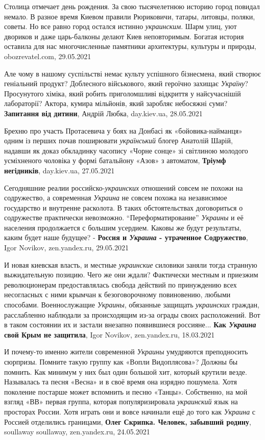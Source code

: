 Столица отмечает день рождения. За свою тысячелетнюю историю город повидал
немало. В разное время Киевом правили Рюриковичи, татары, литовцы, поляки,
советы. Но все равно город остался истинно \emph{украинским}. Шарм улиц, уют
двориков и даже царь-балконы делают Киев неповторимым. Богатая история оставила
для нас многочисленные памятники архитектуры, культуры и природы, obozrevatel.com, 29.05.2021

Але чому в нашому суспільстві немає культу успішного бізнесмена, який створює
геніальний продукт? Доблесного військового, який героїчно захищає
\emph{Україну}?  Просунутого хіміка, який робить приголомшливі відкриття у
найсучаснішій лабораторії? Актора, кумира мільйонів, який заробляє небосяжні
суми? \textbf{Запитання від дитини}, Андрій Любка, day.kiev.ua, 28.05.2021

Брехню про участь Протасевича у боях на Донбасі як «бойовика-найманця» одним із
перших почав поширювати \emph{український} блогер Анатолій Шарій, надавши як
доказ обкладинку часопису «Чорне сонце» зі світлиною молодого усміхненого
чоловіка у формі батальйону «Азов» з автоматом, \textbf{Тріумф негідників},
day.kiev.ua, 27.05.2021

Сегодняшние реалии российско-\emph{украинских} отношений совсем не похожи на
содружество, а современная \emph{Украина} не совсем похожа на независимое
государство и внутренне расколота. В таких обстоятельствах договориться о
содружестве практически невозможно. \enquote{Переформатирование} \emph{Украины}
и её населения продолжается с большим усердием. Каковы же будут результаты,
каким будет наше будущее? - \textbf{Россия и \emph{Украина} - утраченное
Содружество}, Igor Novikov, zen.yandex.ru, 29.05.2021

И новая киевская власть, и местные \emph{украинские} силовики заняли тогда
странную выжидательную позицию. Чего же они ждали? Фактически местным и
приезжим революционерам предоставлялась свобода действий по принуждению всех
несогласных с ними крымчан к безоговорочному повиновению, любыми способами.
Военнослужащие \emph{Украины}, обязанные защищать \emph{украинских} граждан,
расслабленно наблюдали за происходящим из-за ограды своих расположений. Вот в
таком состоянии их и застали внезапно появившиеся россияне... \textbf{Как
\emph{Украина} свой Крым не защитила}, Igor Novikov, zen.yandex.ru, 18.03.2021

И почему-то именно жители современной \emph{Украины} умудряются преподносить
сюрпризы.  Помните такую группу как «Вопли Видоплясова»? Должны бы помнить. Как
минимум у них был один большой хит, который крутили везде. Называлась та песня
«Весна» и в своё время она изрядно пошумела. Хотя поколение постарше может
вспомнить и песню «Танцы». Собственно, на мой взгляд «ВВ» первая группа,
которая популяризировала \emph{украинский} язык на просторах России. Хотя
играть они и вовсе начинали ещё до того как \emph{Украина} с Россией отделились
границами, \textbf{Олег Скрипка. Человек, забывший родину}, soullaway
soullaway, zen.yandex.ru, 24.05.2021

